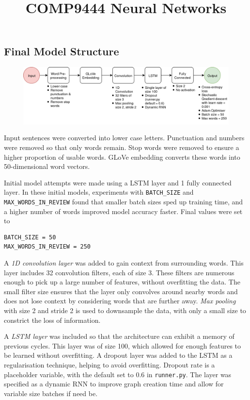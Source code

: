 \documentclass[a4paper,12pt]{article}
\title{COMP9444 Neural Networks}
\date{}
\newcommand{\code}{\texttt}
\begin{document}
\subsection*{Final Model Structure}

\begin{figure}[h]
\begin{center}
\includegraphics[width=\linewidth]{diagram.png}
\end{center}
\end{figure}

Input sentences were converted into lower case letters. Punctuation and numbers were removed so that only words remain. Stop words were removed to ensure a higher proportion of usable words. GLoVe embedding converts these words into 50-dimensional word vectors.

Initial model attempts were made using a LSTM layer and 1 fully connected layer. In these initial models, experiments with \code{BATCH\_SIZE} and \code{MAX\_WORDS\_IN\_REVIEW} found that smaller batch sizes sped up training time, and a higher number of words improved model accuracy faster. Final values were set to \begin{verbatim}
BATCH_SIZE = 50
MAX_WORDS_IN_REVIEW = 250
\end{verbatim}

A \textit{1D convolution layer} was added to gain context from surrounding words. This layer includes 32 convolution filters, each of size 3. These filters are numerous enough to pick up a large number of features, without overfitting the data. The small filter size ensures that the layer only convolves around nearby words and does not lose context by considering words that are further away. \textit{Max pooling} with size 2 and stride 2 is used to downsample the data, with only a small size to constrict the loss of information.

A \textit{LSTM layer} was included so that the architecture can exhibit a memory of previous cycles. This layer was of size 100, which allowed for enough features to be learned without overfitting. A dropout layer was added to the LSTM as a regularisation technique, helping to avoid overfitting. Dropout rate is a placeholder variable, with the default set to 0.6 in \code{runner.py}. The layer was specified as a dynamic RNN to improve graph creation time and allow for variable size batches if need be.
\end{document}
